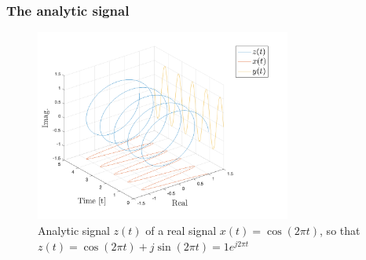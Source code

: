 \begin{frame}
    \frametitle{The analytic signal}
    \small
    
    \begin{figure}
        \centering
        \includegraphics[width=0.75\textwidth]{images/analytic-signal.png}
        \caption{Analytic signal $z(t)$ of a real signal $x(t)=\cos(2\pi t)$, so that $z(t)=\cos(2\pi t) + j\sin(2\pi t) = 1 e^{j2\pi t}$}
        \label{fig:spectrum}
    \end{figure}
   
\end{frame}
